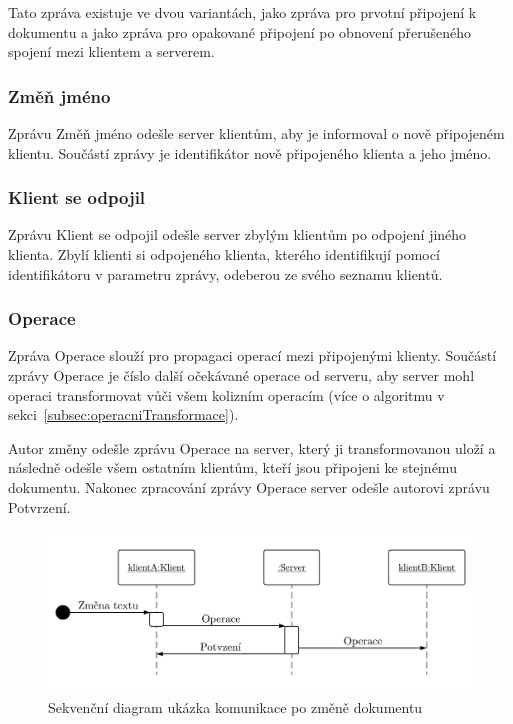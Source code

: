 Tato zpráva existuje ve dvou variantách, jako zpráva pro prvotní připojení k dokumentu a jako zpráva pro opakované připojení po obnovení přerušeného spojení mezi klientem a serverem.

\subsubsection{Změň jméno} %

Zprávu Změň jméno odešle server klientům, aby je informoval o nově připojeném klientu.
Součástí zprávy je identifikátor nově připojeného klienta a jeho jméno.

\subsubsection{Klient se odpojil} %

Zprávu Klient se odpojil odešle server zbylým klientům po odpojení jiného klienta.
Zbylí klienti si odpojeného klienta, kterého identifikují pomocí identifikátoru v parametru zprávy, odeberou ze svého seznamu klientů.

\subsubsection{Operace} %

Zpráva Operace slouží pro propagaci operací mezi připojenými klienty.
Součástí zprávy Operace je číslo další očekávané operace od serveru, aby server mohl operaci transformovat vůči všem kolizním operacím (více o algoritmu v sekci~\ref{subsec:operacniTransformace}).

Autor změny odešle zprávu Operace na server, který ji transformovanou uloží a následně odešle všem ostatním klientům, kteří jsou připojeni ke stejnému dokumentu.
Nakonec zpracování zprávy Operace server odešle autorovi zprávu Potvrzení.

\begin{figure}[ht!]
    \centering
    \includegraphics[width=\textwidth]{partials/navrh/ukazkaKomunikaceVeSkutečnémČase.pdf}
    \caption{Sekvenční diagram ukázka komunikace po změně dokumentu}\label{fig:ukazkaKomunikaceVeSkutečnémČase}
\end{figure}

